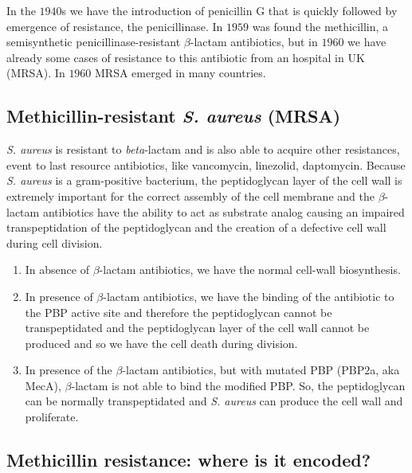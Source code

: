 In the $1940$s we have the introduction of penicillin G that is quickly followed by emergence of resistance, the penicillinase. 
In $1959$ was found the methicillin, a semisynthetic penicillinase-resistant $\beta$-lactam antibiotics, but in $1960$ we have already some cases of resistance to this antibiotic from an hospital in UK (MRSA). In $1960$ MRSA emerged in many countries. 

\subsection{Methicillin-resistant \emph{S. aureus} (MRSA)}

\emph{S. aureus} is resistant to \emph{beta}-lactam and is also able to acquire other resistances, event to last resource antibiotics, like vancomycin, linezolid, daptomycin.
Because \emph{S. aureus} is a gram-positive bacterium, the peptidoglycan layer of the cell wall is extremely important for the correct assembly of the cell membrane and the $\beta$-lactam antibiotics have the ability to act as substrate analog causing an impaired transpeptidation of the peptidoglycan and the creation of a defective cell wall during cell division.

\begin{enumerate}
    \item In absence of $\beta$-lactam antibiotics, we have the normal cell-wall biosynthesis.
    \item In presence of $\beta$-lactam antibiotics, we have the binding of the antibiotic to the PBP active site and therefore the peptidoglycan cannot be transpeptidated and the peptidoglycan layer of the cell wall cannot be produced and so we have the cell death during division. 
    \item In presence of the $\beta$-lactam antibiotics, but with mutated PBP (PBP$2$a, aka MecA), $\beta$-lactam is not able to bind the modified PBP. So, the peptidoglycan can be normally transpeptidated and \emph{S. aureus} can produce the cell wall and proliferate. 
\end{enumerate}

\subsection{Methicillin resistance: where is it encoded?}

